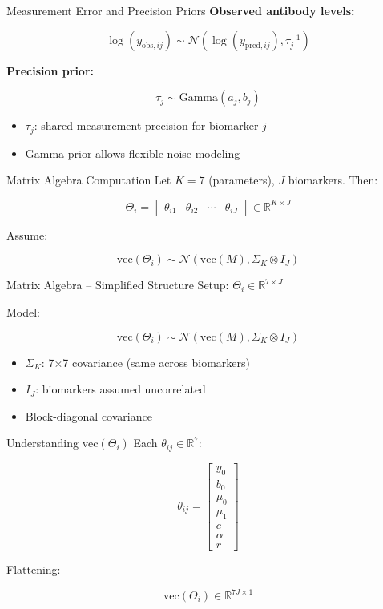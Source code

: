 \documentclass[
  ignorenonframetext,
]{beamer}
\providecommand{\tightlist}{%
  \setlength{\itemsep}{0pt}\setlength{\parskip}{0pt}}\usepackage{longtable,booktabs,array}
\begin{document}
\begin{frame}{Measurement Error and Precision Priors}
\label{measurement-error-and-precision-priors}
\textbf{Observed antibody levels:}

\[
\log(y_{\text{obs},ij}) \sim \mathcal{N}(\log(y_{\text{pred},ij}), \tau_j^{-1})
\]

\textbf{Precision prior:}

\[
\tau_j \sim \text{Gamma}(a_j, b_j)
\]

\begin{itemize}
\tightlist
\item
  \(\tau_j\): shared measurement precision for biomarker \(j\)
\item
  Gamma prior allows flexible noise modeling
\end{itemize}
\end{frame}

\begin{frame}{Matrix Algebra Computation}
\label{matrix-algebra-computation}
Let \(K = 7\) (parameters), \(J\) biomarkers. Then:

\[
\Theta_i =
\begin{bmatrix}
\theta_{i1} & \theta_{i2} & \cdots & \theta_{iJ}
\end{bmatrix}
\in \mathbb{R}^{K \times J}
\]

Assume:

\[
\text{vec}(\Theta_i) \sim \mathcal{N}(\text{vec}(M), \Sigma_K \otimes I_J)
\]
\end{frame}

\begin{frame}{Matrix Algebra -- Simplified Structure}
\label{matrix-algebra-simplified-structure}
Setup: \(\Theta_i \in \mathbb{R}^{7 \times J}\)

Model:

\[
\text{vec}(\Theta_i) \sim \mathcal{N}(\text{vec}(M), \Sigma_K \otimes I_J)
\]

\begin{itemize}
\tightlist
\item
  \(\Sigma_K\): 7×7 covariance (same across biomarkers)
\item
  \(I_J\): biomarkers assumed uncorrelated
\item
  Block-diagonal covariance
\end{itemize}
\end{frame}

\begin{frame}{Understanding \(\text{vec}(\Theta_i)\)}
\label{understanding-textvectheta_i}
Each \(\theta_{ij} \in \mathbb{R}^7\):

\[
\theta_{ij} =
\begin{bmatrix}
y_0 \\
b_0 \\
\mu_0 \\
\mu_1 \\
c \\
\alpha \\
r
\end{bmatrix}
\]

Flattening:

\[
\text{vec}(\Theta_i) \in \mathbb{R}^{7J \times 1}
\]
\end{frame}
\end{document}

